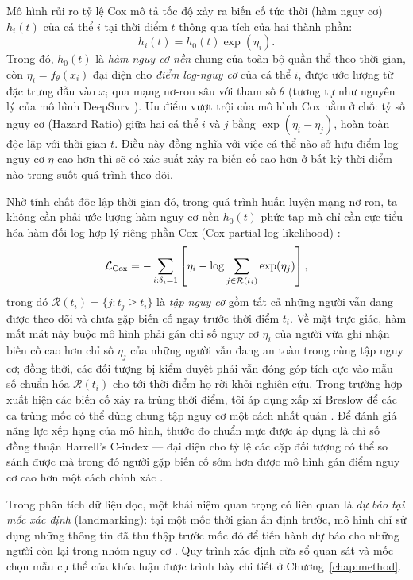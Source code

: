 Mô hình rủi ro tỷ lệ Cox \cite{cox1972regression} mô tả tốc độ xảy ra biến cố tức thời (hàm nguy cơ) $h_i(t)$ của cá thể $i$ tại thời điểm $t$ thông qua tích của hai thành phần:
\begin{equation}
 h_i(t)=h_0(t)\exp(\eta_i).
 \label{eq:cox-hazard}
\end{equation}
Trong đó, $h_0(t)$ là \emph{hàm nguy cơ nền} chung của toàn bộ quần thể theo thời gian, còn $\eta_i = f_\theta(x_i)$ đại diện cho \emph{điểm log-nguy cơ} của cá thể $i$, được ước lượng từ đặc trưng đầu vào $x_i$ qua mạng nơ-ron sâu với tham số $\theta$ (tương tự như nguyên lý của mô hình DeepSurv \cite{katzman2018deepsurv}). Ưu điểm vượt trội của mô hình Cox nằm ở chỗ: tỷ số nguy cơ (Hazard Ratio) giữa hai cá thể $i$ và $j$ bằng $\exp(\eta_i - \eta_j)$, hoàn toàn độc lập với thời gian $t$. Điều này đồng nghĩa với việc cá thể nào sở hữu điểm log-nguy cơ $\eta$ cao hơn thì sẽ có xác suất xảy ra biến cố cao hơn ở bất kỳ thời điểm nào trong suốt quá trình theo dõi.

Nhờ tính chất độc lập thời gian đó, trong quá trình huấn luyện mạng nơ-ron, ta không cần phải ước lượng hàm nguy cơ nền $h_0(t)$ phức tạp mà chỉ cần cực tiểu hóa hàm đối log-hợp lý riêng phần Cox (Cox partial log-likelihood) \cite{cox1972regression,katzman2018deepsurv}:
\begin{equation}
 \mathcal L_{\rm Cox}=-\sum_{i:\delta_i=1}\left[\eta_i-\log\sum_{j\in\mathcal R(t_i)}\exp(\eta_j)\right],
 \label{eq:cox-loss}
\end{equation}
trong đó $\mathcal R(t_i)=\{j:t_j\geq t_i\}$ là \emph{tập nguy cơ} gồm tất cả những người vẫn đang được theo dõi và chưa gặp biến cố ngay trước thời điểm $t_i$. Về mặt trực giác, hàm mất mát này buộc mô hình phải gán chỉ số nguy cơ $\eta_i$ của người vừa ghi nhận biến cố cao hơn chỉ số $\eta_j$ của những người vẫn đang an toàn trong cùng tập nguy cơ; đồng thời, các đối tượng bị kiểm duyệt phải vẫn đóng góp tích cực vào mẫu số chuẩn hóa $\mathcal R(t_i)$ cho tới thời điểm họ rời khỏi nghiên cứu. Trong trường hợp xuất hiện các biến cố xảy ra trùng thời điểm, tôi áp dụng xấp xỉ Breslow để các ca trùng mốc có thể dùng chung tập nguy cơ một cách nhất quán \cite{breslow1974covariance}. Để đánh giá năng lực xếp hạng của mô hình, thước đo chuẩn mực được áp dụng là chỉ số đồng thuận Harrell's C-index — đại diện cho tỷ lệ các cặp đối tượng có thể so sánh được mà trong đó người gặp biến cố sớm hơn được mô hình gán điểm nguy cơ cao hơn một cách chính xác \cite{harrell1996multivariable}.

Trong phân tích dữ liệu dọc, một khái niệm quan trọng có liên quan là \emph{dự báo tại mốc xác định} (landmarking): tại một mốc thời gian ấn định trước, mô hình chỉ sử dụng những thông tin đã thu thập trước mốc đó để tiến hành dự báo cho những người còn lại trong nhóm nguy cơ \cite{vanhouwelingen2007dynamic}. Quy trình xác định cửa sổ quan sát và mốc chọn mẫu cụ thể của khóa luận được trình bày chi tiết ở Chương~\ref{chap:method}.

